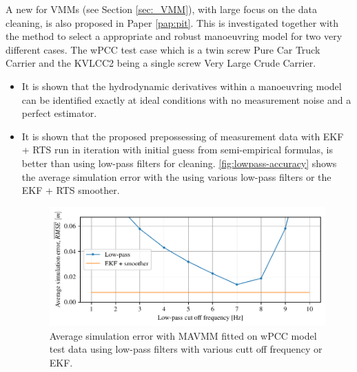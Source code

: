 \noindent A new  for VMMs (see Section \ref{sec:_VMM}), with large focus on the data cleaning, is also proposed in Paper \ref{pap:pit}. This  is investigated together with the method to select a appropriate and robust manoeuvring model for two very different cases. The wPCC test case which is a twin screw Pure Car Truck Carrier and the KVLCC2 being a single screw Very Large Crude Carrier.    
\begin{itemize}
    
    \item It is shown that the hydrodynamic derivatives within a manoeuvring model can be identified exactly at ideal conditions with no measurement noise and a perfect estimator.
    
    \item It is shown that the proposed prepossessing of measurement data with EKF + RTS run in iteration with initial guess from semi-empirical formulas, is better than using low-pass filters for cleaning. \autoref{fig:lowpass-accuracy} shows the average simulation error with the  using various low-pass filters or the EKF + RTS smoother.
    \begin{figure}[h]
        \centering
        \includegraphics{kappa/images/6.pdf}
        \caption{Average simulation error with MAVMM fitted on wPCC model test data using low-pass filters with various cutt off frequency or EKF.}
        \label{fig:lowpass-accuracy}
    \end{figure}
    

\end{itemize}
